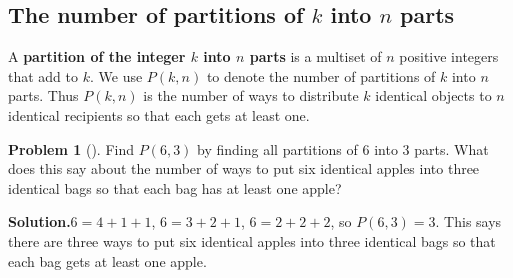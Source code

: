 \documentclass[10pt,]{book}
\newcommand{\terminology}[1]{\textbf{#1}}
\theoremstyle{plain}
\theoremstyle{definition}
\newtheorem{activity}[project]{Problem}
\theoremstyle{definition}
\numberwithin{equation}{chapter}
\begin{document}
\subsection[{The number of partitions of \(k\) into \(n\) parts}]{The number of partitions of \(k\) into \(n\) parts}\label{subsection-30}
A \terminology{partition of the integer \(k\) into \(n\) parts} is a multiset of \(n\) positive integers that add to \(k\). We use \(P(k,n)\) to denote the number of partitions of \(k\) into \(n\) parts. Thus \(P(k,n)\) is the number of ways to distribute \(k\) identical objects to \(n\) identical recipients so that each gets at least one.%
\begin{activity}[]\label{activity-158}
Find \(P(6,3)\) by finding all partitions of 6 into 3 parts. What does this say about the number of ways to put six identical apples into three identical bags so that each bag has at least one apple?%
\par\medskip\noindent%
\textbf{Solution.}\quad \(6=4+1+1\), \(6=3+2+1\), \(6=2+2+2\), so \(P(6,3)=3\). This says there are three ways to put six identical apples into three identical bags so that each bag gets at least one apple.%
\end{activity}
\typeout{************************************************}
\typeout{************************************************}
\end{document}
